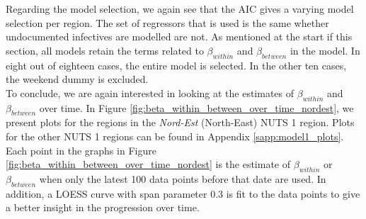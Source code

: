 \documentclass[12pt]{article}
\begin{document}
    Regarding the model selection, we again see that the AIC gives a varying model selection per region. The set of regressors that is used is the same whether undocumented infectives are modelled are not. As mentioned at the start if this section, all models retain the terms related to $\beta_{within}$ and $\beta_{between}$ in the model. In eight out of eighteen cases, the entire model is selected. In the other ten cases, the weekend dummy is excluded. \\
    
    To conclude, we are again interested in looking at the estimates of $\beta_{within}$ and $\beta_{between}$ over time. In Figure \ref{fig:beta_within_between_over_time_nordest}, we present plots for the regions in the \textit{Nord-Est} (North-East) NUTS 1 region. Plots for the other NUTS 1 regions can be found in Appendix \ref{sapp:model1_plots}. Each point in the graphs in Figure \ref{fig:beta_within_between_over_time_nordest} is the estimate of $\beta_{within}$ or $\beta_{between}$ when only the latest 100 data points before that date are used. In addition, a LOESS curve with span parameter 0.3 is fit to the data points to give a better insight in the progression over time. \\
    
\end{document}
